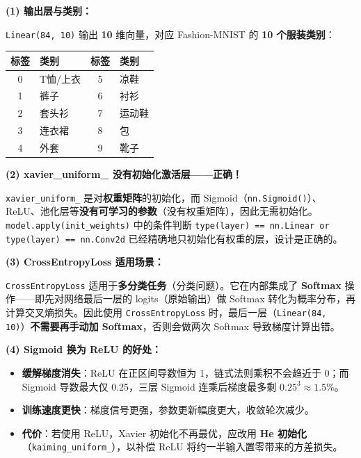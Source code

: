 \documentclass[a4paper,11pt]{ctexart}
\begin{document}
\begin{solutionbox}[参考答案与详细解析]
    \textbf{(1) 输出层与类别：}

    \texttt{Linear(84, 10)} 输出 \textbf{10} 维向量，对应 Fashion-MNIST 的 \textbf{10 个服装类别}：

    \begin{center}
    \begin{tabular}{clcl}
        \toprule
        标签 & 类别 & 标签 & 类别 \\
        \midrule
        0 & T恤/上衣 & 5 & 凉鞋 \\
        1 & 裤子 & 6 & 衬衫 \\
        2 & 套头衫 & 7 & 运动鞋 \\
        3 & 连衣裙 & 8 & 包 \\
        4 & 外套 & 9 & 靴子 \\
        \bottomrule
    \end{tabular}
    \end{center}

    \vspace{0.5em}
    \textbf{(2) xavier\_uniform\_ 没有初始化激活层——正确！}

    \texttt{xavier\_uniform\_} 是对\textbf{权重矩阵}的初始化，而 Sigmoid（\texttt{nn.Sigmoid()}）、ReLU、池化层等\textbf{没有可学习的参数}（没有权重矩阵），因此无需初始化。\texttt{model.apply(init\_weights)} 中的条件判断 \texttt{type(layer) == nn.Linear or type(layer) == nn.Conv2d} 已经精确地只初始化有权重的层，设计是正确的。

    \vspace{0.5em}
    \textbf{(3) CrossEntropyLoss 适用场景：}

    \texttt{CrossEntropyLoss} 适用于\textbf{多分类任务}（分类问题）。它在内部集成了 \textbf{Softmax} 操作——即先对网络最后一层的 logits（原始输出）做 Softmax 转化为概率分布，再计算交叉熵损失。因此使用 \texttt{CrossEntropyLoss} 时，最后一层（\texttt{Linear(84, 10)}）\textbf{不需要再手动加 Softmax}，否则会做两次 Softmax 导致梯度计算出错。

    \vspace{0.5em}
    \textbf{(4) Sigmoid 换为 ReLU 的好处：}

    \begin{itemize}
        \item \textbf{缓解梯度消失}：ReLU 在正区间导数恒为 1，链式法则乘积不会趋近于 0；而 Sigmoid 导数最大仅 0.25，三层 Sigmoid 连乘后梯度最多剩 $0.25^3 \approx 1.5\%$。
        \item \textbf{训练速度更快}：梯度信号更强，参数更新幅度更大，收敛轮次减少。
        \item \textbf{代价}：若使用 ReLU，Xavier 初始化不再最优，应改用 \textbf{He 初始化}（\texttt{kaiming\_uniform\_}），以补偿 ReLU 将约一半输入置零带来的方差损失。
    \end{itemize}


\end{solutionbox}
\end{document}
